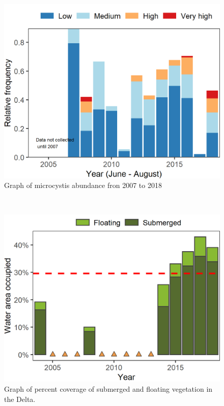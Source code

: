 \documentclass[
]{book}
\begin{document}
\begin{panel-grid}
\begin{columns-nocenter}
\begin{column800}
\begin{expand}
\begin{figure}
\includegraphics[width=15.25in]{figures/Microcystis_summer} \caption{Graph of microcystis abundance fron 2007 to 2018}\label{fig:unnamed-chunk-89}
\end{figure}

\end{expand}

\end{column800}

\begin{column40}

~

\end{column40}

\begin{column800}

\begin{expand}

\begin{figure}
\includegraphics[width=15.25in]{figures/veg_perc} \caption{Graph of percent coverage of submerged and floating vegetation in the Delta.}\label{fig:unnamed-chunk-90}
\end{figure}


\end{expand}
\end{column800}
\end{columns-nocenter}
\end{panel-grid}
\end{document}
